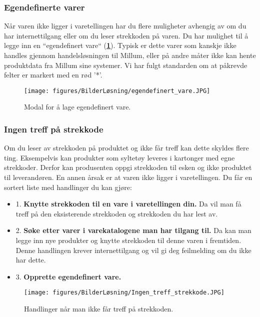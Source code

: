 \subsubsection{\textbf{Egendefinerte varer}}
Når varen ikke ligger i varetellingen har du flere muligheter avhengig av om du har internettilgang eller om du leser strekkoden på varen. Du har mulighet til å legge inn en ``egendefinert vare`` (\textbf{\ref{Egendefinert_vare}}). Typisk er dette varer som kanskje ikke handles gjennom handelsløsningen til Millum, eller på andre måter ikke kan hente produktdata fra Millum sine systemer. Vi har fulgt standarden om at påkrevde felter er markert med en rød '*'.

\begin{figure}[H] 
    \centering
    \texttt{[image: figures/BilderLøsning/egendefinert\_vare.JPG]}
    \caption{Modal for å lage egendefinert vare.}
    \label{Egendefinert_vare}
\end{figure}

\subsubsection{\textbf{Ingen treff på strekkode}}
Om du leser av strekkoden på produktet og ikke får treff kan dette skyldes flere ting. Eksempelvis kan produkter som syltetøy leveres i kartonger med egne strekkoder. Derfor kan produsenten oppgi strekkoden til esken og ikke produktet til leverandøren. En annen årsak er at varen ikke ligger i varetellingen. Du får en sortert liste med handlinger du kan gjøre:
\begin{itemize}
    \item 1. \textbf{Knytte strekkoden til en vare i varetellingen din.} Da vil man få treff på den eksisterende strekkoden og strekkoden du har lest av.
    \item 2. \textbf{Søke etter varer i varekatalogene man har tilgang til.} Da kan man legge inn nye produkter og knytte strekkoden til denne varen i fremtiden. Denne handlingen krever internettilgang og vil gi deg feilmelding om du ikke har dette.
    \item 3. \textbf{Opprette egendefinert vare.}
\end{itemize}

\begin{figure}[H] 
    \centering
    \texttt{[image: figures/BilderLøsning/Ingen\_treff\_strekkode.JPG]}
    \caption{Handlinger når man ikke får treff på strekkoden.}
\end{figure}

